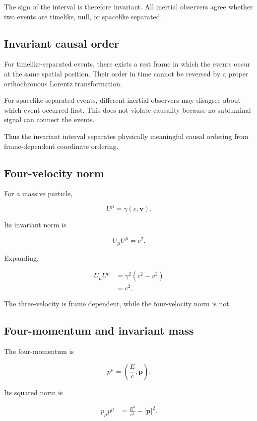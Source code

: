 The sign of the interval is therefore invariant. All inertial observers agree whether two events are timelike, null, or spacelike separated.

\subsection{Invariant causal order}

For timelike-separated events, there exists a rest frame in which the events occur at the same spatial position. Their order in time cannot be reversed by a proper orthochronous Lorentz transformation.

For spacelike-separated events, different inertial observers may disagree about which event occurred first. This does not violate causality because no subluminal signal can connect the events.

Thus the invariant interval separates physically meaningful causal ordering from frame-dependent coordinate ordering.

\subsection{Four-velocity norm}

For a massive particle,

\[
U^{\mu}
=
\gamma(c,\mathbf{v}).
\]

Its invariant norm is

\[
\boxed{
U_{\mu}U^{\mu}=c^{2}
}.
\]

Expanding,

\[
\begin{aligned}
U_{\mu}U^{\mu}
&=
\gamma^{2}(c^{2}-v^{2})\\
&=
c^{2}.
\end{aligned}
\]

The three-velocity is frame dependent, while the four-velocity norm is not.

\subsection{Four-momentum and invariant mass}

The four-momentum is

\[
p^{\mu}
=
\left(
\frac{E}{c},
\mathbf{p}
\right).
\]

Its squared norm is

\[
\begin{aligned}
p_{\mu}p^{\mu}
&=
\frac{E^{2}}{c^{2}}
-
|\mathbf{p}|^{2}.
\end{aligned}
\]

